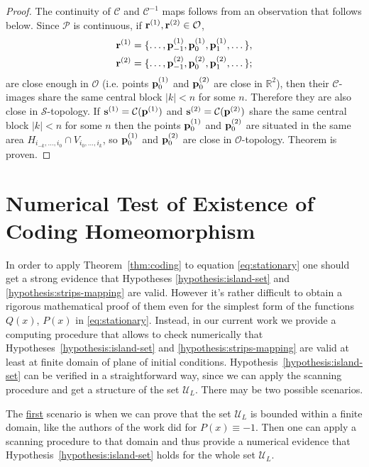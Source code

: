 \begin{proof}
	The continuity of $\mathcal{C}$ and $\mathcal{C}^{-1}$ maps follows from an observation that follows below.
	Since $\mathcal{P}$ is continuous, if $\vb{r}^{(1)}, \vb{r}^{(2)} \in \mathcal{O}$,
	\begin{eqnarray*}
		& \vb{r}^{(1)} = \{ \dots, \vb{p}_{-1}^{(1)}, \vb{p}_0^{(1)}, \vb{p}_1^{(1)}, \dots \}, \\
		& \vb{r}^{(2)} = \{ \dots, \vb{p}_{-1}^{(2)}, \vb{p}_0^{(2)}, \vb{p}_1^{(2)}, \dots \};
	\end{eqnarray*}
	are close enough in $\mathcal{O}$ (i.e. points $\vb{p}_0^{(1)}$ and $\vb{p}_0^{(2)}$ are close in $\mathbb{R}^2$), then their $\mathcal{C}$-images share the same central block $|k| < n$ for some $n$.
	Therefore they are also close in $\mathcal{S}$-topology.
	If $\vb{s}^{(1)} = \mathcal{C}(\vb{p}^{(1)})$ and $\vb{s}^{(2)} = \mathcal{C}(\vb{p}^{(2)})$ share the same central block $|k| < n$ for some $n$ then the points $\vb{p}_0^{(1)}$ and $\vb{p}_0^{(2)}$ are situated in the same area $H_{i_{-k}, \dots, i_0} \cap V_{i_0, \dots, i_k}$, so $\vb{p}_0^{(1)}$ and $\vb{p}_0^{(2)}$ are close in $\mathcal{O}$-topology.
	Theorem is proven.
\end{proof}

\section{Numerical Test of Existence of Coding Homeomorphism}

In order to apply Theorem~\ref{thm:coding} to equation \eqref{eq:stationary} one should get a strong evidence that Hypotheses \ref{hypothesis:island-set} and \ref{hypothesis:strips-mapping} are valid.
However it's rather difficult to obtain a rigorous mathematical proof of them even for the simplest form of the functions $Q(x)$, $P(x)$ in \eqref{eq:stationary}.
Instead, in our current work we provide a computing procedure that allows to check numerically that Hypotheses~\ref{hypothesis:island-set} and \ref{hypothesis:strips-mapping} are valid at least at finite domain of plane of initial conditions.
Hypothesis~\ref{hypothesis:island-set} can be verified in a straightforward way, since we can apply the scanning procedure and get a structure of the set $\mathscr{U}_L$.
There may be two possible scenarios.

The \underline{first} scenario is when we can prove that the set $\mathscr{U}_L$ is bounded within a finite domain, like the authors of the work \cite{AlfimovAvramenko} did for $P(x) \equiv -1$.
Then one can apply a scanning procedure to that domain and thus provide a numerical evidence that Hypothesis~\ref{hypothesis:island-set} holds for the whole set $\mathscr{U}_L$.

